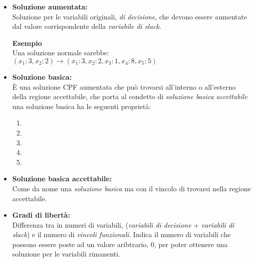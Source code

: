 \documentclass{article}
\begin{document}
    \begin{itemize}
      \item \textbf{Soluzione aumentata:} \\
        Soluzione per le variabili originali, \textit{di decisione}, che devono essere aumentate dal valore corrispondente della \textit{variabile di slack}. \\
          \begin{tcolorbox}
            \textbf{Esempio}\\
              Una soluzione normale sarebbe: $(x_1:3,x_2:2) \to (x_1:3,x_2:2, x_3:1, x_4:8, x_5:5) $
          \end{tcolorbox}
      \item \textbf{Soluzione basica:} \\
        È una soluzione CPF aumentata che può trovarsi all'interno o all'esterno della regione accettabile, che porta al condetto di \textit{soluzione basica accettabile} una soluzione basica ha le seguenti proprietà:
        \begin{enumerate}
          \item 
          \item
          \item
          \item
          \item
        \end{enumerate}
      \item \textbf{Soluzione basica accettabile:}\\
        Come da nome una \textit{soluzione basica} ma con il vincolo di trovarsi nella regione accettabile. 
      \item \textbf{Gradi di libertà:} \\
        Differenza tra in numeri di variabili, (\textit{variabili di decisione} + \textit{variabili di slack}) e il numero di \textit{vincoli funzionali}. Indica il numero di variabili che possono essere poste ad un valore aribtrario, $0$, per poter ottenere una soluzione per le variabili rimanenti.
    \end{itemize}


    
\end{document}
